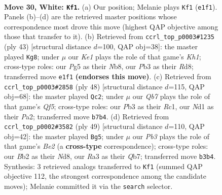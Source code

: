 \documentclass[11pt]{article}
\begin{document}
\clearpage

\begin{figure}[p]\centering
\begin{subfigure}{0.46\textwidth}\centering
\resizebox{\linewidth}{!}{%
\newchessgame
\chessboard[
  setfen={1n1qkbr1/1Q2n3/r1p3p1/p2p2P1/3P1PBp/RP5P/1BP5/3NK2R w - - 3 30},
  showmover=false,
  pgfstyle=straightmove, color=movearrow, markmove={e1-f1}
]}
\caption{}
\end{subfigure}\hfill
\begin{subfigure}{0.46\textwidth}\centering
\resizebox{\linewidth}{!}{%
\newchessgame
\chessboard[
  setfen={1n1r3k/p4pp1/2b2b1p/q2p1B1P/2pP4/2N1PN2/P1Q2PP1/3R2K1 b - - 1 22},
  showmover=false,
  pgfstyle=straightmove, color=movearrow, markmove={h8-g8}
]}
\caption{}
\end{subfigure}
\\[4pt]
\begin{subfigure}{0.46\textwidth}\centering
\resizebox{\linewidth}{!}{%
\newchessgame
\chessboard[
  setfen={r5k1/p3qppp/3rnn2/2ppNQ2/8/1P3BP1/P3PP1P/2RR2K1 w - - 13 25},
  showmover=false,
  pgfstyle=straightmove, color=movearrow, markmove={f5-c2}
]}
\caption{}
\end{subfigure}\hfill
\begin{subfigure}{0.46\textwidth}\centering
\resizebox{\linewidth}{!}{%
\newchessgame
\chessboard[
  setfen={3n1rk1/1q2b1p1/3pb2p/1Pp1pp2/R1P5/1B2N3/Q2N1PPP/6K1 b - - 1 25},
  showmover=false,
  pgfstyle=straightmove, color=movearrow, markmove={e7-g5}
]}
\caption{}
\end{subfigure}
\caption{\textbf{Move 30, White: \texttt{Kf1}.} (a) Our position; Melanie plays \texttt{Kf1} (\texttt{e1f1}). Panels (b)--(d) are the retrieved master positions whose correspondence most drove this move (highest QAP objective among those that transfer to it). (b) Retrieved from \texttt{ccrl\_top\_p0003\#1235} (ply 43) [structural distance $d$=100, QAP obj=38]: the master played \texttt{Kg8}; under $\mu$ our \emph{Ke1} plays the role of that game's \emph{Kh1}; cross-type roles: our \emph{P}g5 as their \emph{N}b8, our \emph{P}b3 as their \emph{R}d8; transferred move \texttt{e1f1} \textbf{(endorses this move)}. (c) Retrieved from \texttt{ccrl\_top\_p0003\#2858} (ply 48) [structural distance $d$=115, QAP obj=68]: the master played \texttt{Qc2}; under $\mu$ our \emph{Qb7} plays the role of that game's \emph{Qf5}; cross-type roles: our \emph{P}b3 as their \emph{R}c1, our \emph{N}d1 as their \emph{P}a2; transferred move \texttt{b7b4}. (d) Retrieved from \texttt{ccrl\_top\_p0002\#3582} (ply 49) [structural distance $d$=110, QAP obj=42]: the master played \texttt{Bg5}; under $\mu$ our \emph{Pb3} plays the role of that game's \emph{Be2} (a \textbf{cross-type} correspondence); cross-type roles: our \emph{B}b2 as their \emph{N}d8, our \emph{R}a3 as their \emph{Q}b7; transferred move \texttt{b3b4}. Synthesis: 3 retrieved analogs transferred to \texttt{Kf1} (summed QAP objective 112, the strongest correspondence among the candidate moves); Melanie committed it via the \texttt{search} selector.}
\label{fig:thought-m58}
\end{figure}
\end{document}
